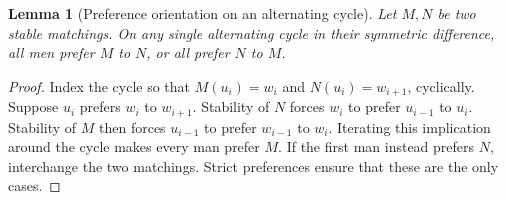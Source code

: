 \documentclass[11pt,a4paper]{article}
\newtheorem{lemma}[theorem]{Lemma}
\theoremstyle{definition}
\theoremstyle{remark}
\begin{document}
\begin{lemma}[Preference orientation on an alternating cycle]
Let $M,N$ be two stable matchings. On any single alternating cycle in their
symmetric difference, all men prefer $M$ to $N$, or all prefer $N$ to $M$.
\end{lemma}
\begin{proof}
Index the cycle so that $M(u_i)=w_i$ and $N(u_i)=w_{i+1}$, cyclically. Suppose
$u_i$ prefers $w_i$ to $w_{i+1}$. Stability of $N$ forces $w_i$ to prefer
$u_{i-1}$ to $u_i$. Stability of $M$ then forces $u_{i-1}$ to prefer
$w_{i-1}$ to $w_i$. Iterating this implication around the cycle makes every man
prefer $M$. If the first man instead prefers $N$, interchange the two matchings.
Strict preferences ensure that these are the only cases.
\end{proof}
\end{document}
